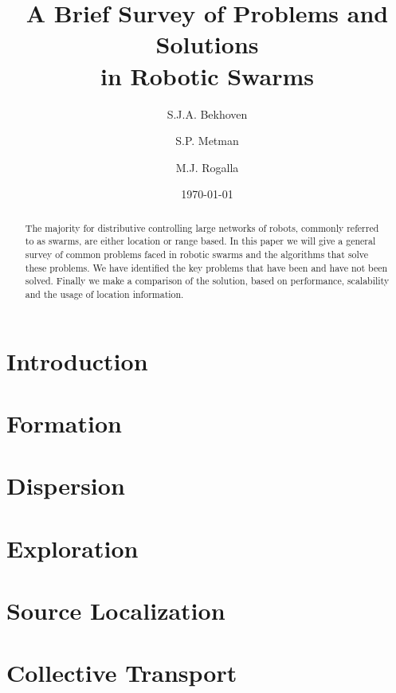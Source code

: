 \documentclass[a4paper]{article}
\title{A Brief Survey of Problems and Solutions \\ in Robotic Swarms}
\author{S.J.A. Bekhoven  \and
    S.P. Metman \and
    M.J. Rogalla}
\date{\today}
\begin{document}
\maketitle
\thispagestyle{empty}

\begin{abstract}
The majority for distributive controlling large networks of robots, commonly referred to as swarms, are either location or range based.
In this paper we will give a general survey of common problems faced in robotic swarms and the algorithms that solve these problems.
We have identified the key problems that have been and have not been solved. Finally we make a comparison of the solution, based on performance, scalability and the usage of location information.
\end{abstract}


\section{Introduction}
  

\section{Formation}
  \label{sec:Formation}
  

\section{Dispersion}
  \label{sec:Dispersion}
  

\section{Exploration}
  \label{sec:Exploration}
  
 
\section{Source Localization}
  \label{sec:Localization}
  

\section{Collective Transport}
  \label{sec:CollectiveTransport}
  
  
\end{document}

